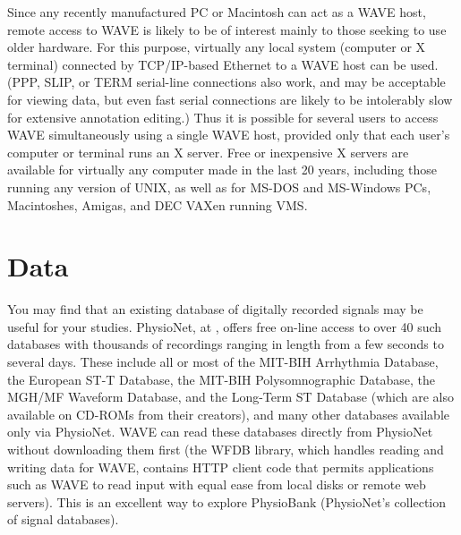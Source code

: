 \documentclass[twoside]{book}
\newcommand{\WAVE}{{\sf WAVE}\xspace}
\begin{document}
  Since any
recently manufactured PC or Macintosh can act as a \WAVE{} host,
remote access to \WAVE{} is likely to be of interest mainly to those
seeking to use older hardware.  For this purpose, virtually any local
system (computer or X terminal) connected by TCP/IP-based Ethernet to
a \WAVE{} host can be used.  (PPP, SLIP, or TERM serial-line
connections also work, and may be acceptable for viewing data, but
even fast serial connections are likely to be intolerably slow for
extensive annotation editing.)  Thus it is possible for several users
to access \WAVE{} simultaneously using a single \WAVE{} host, provided
only that each user's computer or terminal runs an X server.  Free or
inexpensive X servers are available for virtually any computer made in
the last 20 years, including those running any version of UNIX, as well as
for MS-DOS and MS-Windows PCs, Macintoshes, Amigas, and DEC VAXen
running VMS.

\section{Data}
   You may find that an existing database of
digitally recorded signals may be useful for your studies.  PhysioNet, at
,
offers free on-line access to over 40 such databases with thousands of
recordings ranging in length from a few seconds to several days.
These include all or most of the MIT-BIH Arrhythmia Database, the
European ST-T Database, the MIT-BIH Polysomnographic Database, the
MGH/MF Waveform Database, and the Long-Term ST Database (which are
also available on CD-ROMs from their creators), and many other
databases available only via PhysioNet.  \WAVE{} can read these
databases directly from PhysioNet without downloading them first (the
WFDB library, which handles reading and writing data for \WAVE{},
contains HTTP client code that permits applications such as \WAVE{} to
read input with equal ease from local disks or remote web servers).
This is an excellent way to explore PhysioBank (PhysioNet's collection
of signal databases).
\end{document}
